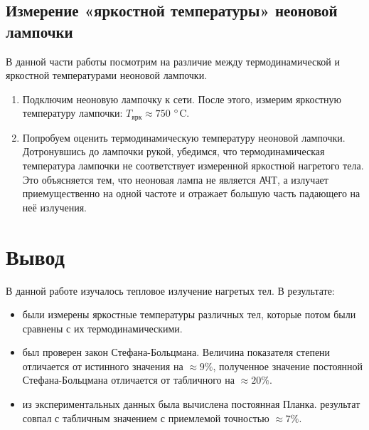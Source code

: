 \documentclass[a4paper,12pt]{article}
\begin{document}
\subsection{Измерение «яркостной температуры» неоновой лампочки}
В данной части работы посмотрим на различие между термодинамической и яркостной температурами неоновой лампочки. 
\begin{enumerate}
    \item
    Подключим неоновую лампочку к сети. После этого, измерим яркостную температуру лампочки: $T_\text{ярк} \approx 750$ $\degree$C. 
    \item 
    Попробуем оценить термодинамическую температуру неоновой лампочки. Дотронувшись до лампочки рукой, убедимся, что термодинамическая температура лампочки не соответствует измеренной яркостной нагретого тела. Это объясняется тем, что неоновая лампа не является АЧТ, а излучает приемущественно на одной частоте  и отражает большую часть падающего на неё излучения.
\end{enumerate}

\section{Вывод}
В данной работе изучалось тепловое излучение нагретых тел. В результате:
\begin{itemize}
    \item
    были измерены яркостные температуры различных тел, которые потом были сравнены с их термодинамическими.  
    \item
    был проверен закон Стефана-Больцмана. Величина показателя степени отличается от истинного значения на $\approx 9\%$, полученное значение постоянной Стефана-Больцмана отличается от табличного на $\approx 20\%$. 
    \item
    из экспериментальных данных была вычислена постоянная Планка. результат совпал с табличным значением с приемлемой точностью $\approx 7\%$. 
    
\end{itemize}

\newpage
\end{document}
